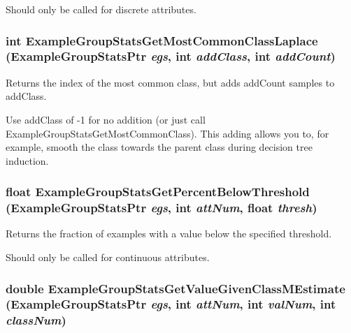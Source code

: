 Should only be called for discrete attributes. 
\subsubsection{\setlength{\rightskip}{0pt plus 5cm}int Example\-Group\-Stats\-Get\-Most\-Common\-Class\-Laplace ({\bf Example\-Group\-Stats\-Ptr} {\em egs}, int {\em add\-Class}, int {\em add\-Count})}\label{ExampleGroupStats_8h_a30}


Returns the index of the most common class, but adds add\-Count samples to add\-Class. 

Use add\-Class of -1 for no addition (or just call Example\-Group\-Stats\-Get\-Most\-Common\-Class). This adding allows you to, for example, smooth the class towards the parent class during decision tree induction. 
\subsubsection{\setlength{\rightskip}{0pt plus 5cm}float Example\-Group\-Stats\-Get\-Percent\-Below\-Threshold ({\bf Example\-Group\-Stats\-Ptr} {\em egs}, int {\em att\-Num}, float {\em thresh})}\label{ExampleGroupStats_8h_a39}


Returns the fraction of examples with a value below the specified threshold. 

Should only be called for continuous attributes. 
\subsubsection{\setlength{\rightskip}{0pt plus 5cm}double Example\-Group\-Stats\-Get\-Value\-Given\-Class\-MEstimate ({\bf Example\-Group\-Stats\-Ptr} {\em egs}, int {\em att\-Num}, int {\em val\-Num}, int {\em class\-Num})}\label{ExampleGroupStats_8h_a37}


